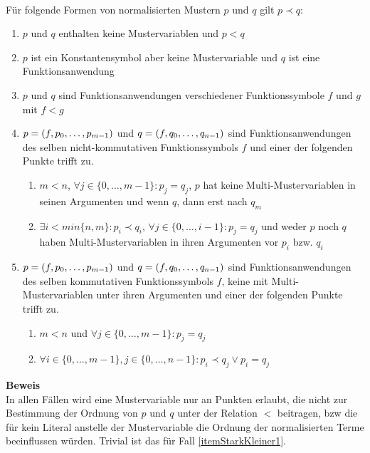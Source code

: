 \begin{lemma}~\\
Für folgende Formen von normalisierten Mustern $p$ und $q$ gilt $p \prec q$:
\begin{enumerate}
	\item{$p$ und $q$ enthalten keine Mustervariablen und $p < q$} \label{itemStarkKleiner1}
	
	\item{$p$ ist ein Konstantensymbol aber keine Mustervariable und $q$ ist eine Funktionsanwendung}  \label{itemStarkKleiner2}
	
	\item{$p$ und $q$ sind Funktionsanwendungen verschiedener Funktionssymbole $f$ und $g$ mit $f < g$}  \label{itemStarkKleiner3}
		
	\item{$p = (f, {p}_{0}, \dots, {p}_{m-1})$ und $q = (f, {q}_{0}, \dots, {q}_{n-1})$ sind Funktionsanwendungen des selben nicht-kommutativen Funktionssymbols $f$ und einer der folgenden Punkte trifft zu.
	\begin{enumerate}
		\item{$m < n$, $\forall j \in \{0, \dots, m-1\} \colon p_j = q_j$, $p$ hat keine Multi-Mustervariablen in seinen Argumenten und wenn $q$, dann erst nach $q_m$}
		\item{$\exists i < min\{n, m\} \colon p_i \prec q_i$, $\forall j \in \{0, \dots, i  - 1\} \colon p_j = q_j$ und weder $p$ noch $q$ haben Multi-Mustervariablen in ihren Argumenten vor $p_i$ bzw. $q_i$}
	\end{enumerate}
	} \label{itemStarkKleiner4}
	
	\item{$p = (f, {p}_{0}, \dots, {p}_{m-1})$ und $q = (f, {q}_{0}, \dots, {q}_{n-1})$ sind Funktionsanwendungen des selben kommutativen Funktionssymbols $f$, keine mit Multi-Mustervariablen unter ihren Argumenten und einer der folgenden Punkte trifft zu.
	\begin{enumerate}
		\item{$m < n$ und $\forall j \in \{0, \dots, m-1\} \colon p_j = q_j$}
		\item{$\forall i \in \{0, \dots, m-1\}, j \in \{0, \dots, n-1\} \colon p_i \prec q_j \lor p_i = q_j$}
	\end{enumerate}
	} \label{itemStarkKleiner5}
	
\end{enumerate}
\end{lemma}

\textbf{Beweis}~\\
In allen Fällen wird eine Mustervariable nur an Punkten erlaubt, die nicht zur Bestimmung der Ordnung von $p$ und $q$ unter der Relation $<$ beitragen, bzw die für kein Literal anstelle der Mustervariable die Ordnung der normalisierten Terme beeinflussen würden. Trivial ist das für Fall \ref{itemStarkKleiner1}.

